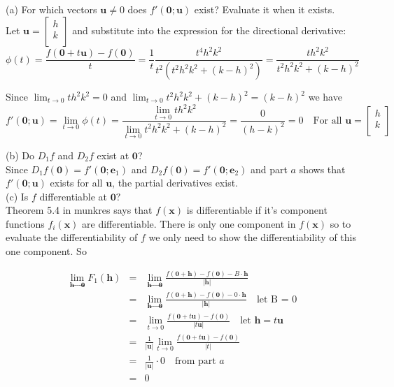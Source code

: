 \documentclass[11pt,reqno]{article}
\begin{document}
\noindent (a) For which vectors $\textbf{u} \neq 0$ does $f'(\textbf{0};\textbf{u})$ exist? Evaluate it when it exists.\\

\noindent Let $\textbf{u} = \left[ \begin{array}{c} h\\ k\\ \end{array} \right]$ and substitute into the expression for the directional derivative:
\[ \phi(t) = \frac{f(\textbf{0} + t \textbf{u}) - f(\textbf{0})}{t} = \frac{1}{t} \frac{t^4 h^2 k^2}{t^2 (t^2 h^2 k^2 + (k - h)^2)} = \frac{t h^2 k^2}{t^2 h^2 k^2 + (k - h)^2} \]

Since $\lim_{t \to 0} t h^2 k^2 = 0$ and $\lim_{t \to 0} t^2 h^2 k^2 + (k - h)^2 = (k - h)^2$ we have 
\[ f'(\textbf{0};\textbf{u}) = \lim_{t \to 0} \phi(t) =  \frac{\lim_{t \to 0} t h^2 k^2}{\lim_{t \to 0} t^2 h^2 k^2 + (k - h)^2} = \frac{0}{(h-k)^2}= 0 \quad \text{For all $\textbf{u} = \left[ \begin{array}{c} h\\ k\\ \end{array} \right]$}\]


\noindent (b) Do $D_1 f$ and $D_2 f$ exist at $\textbf{0}$?\\

Since $D_1 f(\textbf{0}) = f'(\textbf{0}; \textbf{e}_1)$ and $D_2 f(\textbf{0}) = f'(\textbf{0}; \textbf{e}_2)$ and part $a$ shows that $f'(\textbf{0};\textbf{u})$ exists for all $\textbf{u}$, the partial derivatives exist.\\

\noindent (c) Is $f$ differentiable at $\textbf{0}?$\\

Theorem 5.4 in munkres says that $f(\textbf{x})$ is differentiable if it's component functions $f_i(\textbf{x})$ are differentiable. There is only one component in $f(\textbf{x})$ so to evaluate the differentiability of $f$ we only need to show the differentiability of this one component. So

\begin{eqnarray*}
\lim_{\textbf{h} \to \textbf{0}} F_1(\textbf{h}) &=&  \lim_{\textbf{h} \to \textbf{0}} \frac{f(\textbf{0} + \textbf{h}) - f(\textbf{0}) - B \cdot \textbf{h}}{|\textbf{h}|} \\
&=&  \lim_{\textbf{h} \to \textbf{0}} \frac{f(\textbf{0} + \textbf{h}) - f(\textbf{0}) - 0 \cdot \textbf{h}}{|\textbf{h}|} \quad \text{let $\text{B}$ = 0}\\
&=&  \lim_{t \to 0} \frac{f(\textbf{0} + t \textbf{u}) - f(\textbf{0})}{|t \textbf{u}|} \quad \text{let $\textbf{h} = t \textbf{u}$}\\
&=& \frac{1}{|\textbf{u}|} \lim_{t \to 0} \frac{f(\textbf{0} + t \textbf{u}) - f(\textbf{0})}{|t|}\\
&=& \frac{1}{|\textbf{u}|} \cdot 0 \quad \text{from part $a$}\\
&=& 0
\end{eqnarray*}
\end{document}
